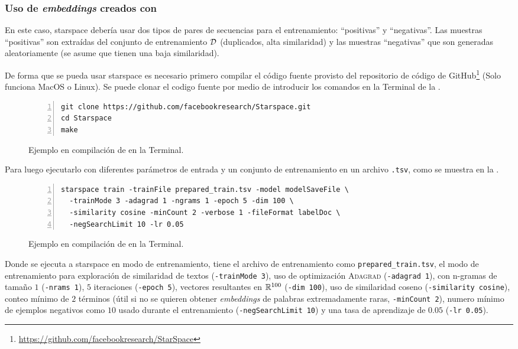\subsubsection{Uso de \emph{embeddings} creados con }
En este caso, \gls{starspace} debería usar dos tipos de pares de secuencias para el entrenamiento: ``positivas'' y ``negativas''. Las muestras ``positivas'' son extraídas del conjunto de entrenamiento $\mathcal{D}$ (duplicados, alta similaridad) y las muestras ``negativas'' que son generadas aleatoriamente (se asume que tienen una baja similaridad).

De forma que se pueda usar \gls{starspace} es necesario primero compilar el código fuente provisto del repositorio de código de GitHub\footnote{\href{https://github.com/facebookresearch/StarSpace}{https://github.com/facebookresearch/StarSpace}} (Solo funciona MacOS o Linux). Se puede clonar el codigo fuente por medio de introducir los  comandos en la Terminal de la .

\begin{figure}[ht]
\centering
\begin{Verbatim}[numbers=left,numbersep=2pt]
git clone https://github.com/facebookresearch/Starspace.git
cd Starspace
make
\end{Verbatim}
\caption{Ejemplo en compilación de  en la Terminal.} 
\label{fig:starspace-terminal-compilation}
\end{figure}

Para luego ejecutarlo con diferentes parámetros de entrada y un conjunto de entrenamiento en un archivo \texttt{.tsv}, como se muestra en la .

\begin{figure}[ht]
\centering
\begin{Verbatim}[fontsize=\footnotesize,numbers=left,numbersep=2pt]
starspace train -trainFile prepared_train.tsv -model modelSaveFile \
  -trainMode 3 -adagrad 1 -ngrams 1 -epoch 5 -dim 100 \
  -similarity cosine -minCount 2 -verbose 1 -fileFormat labelDoc \
  -negSearchLimit 10 -lr 0.05
\end{Verbatim}
\caption{Ejemplo en compilación de \glsentrylong{starspace} en la Terminal.} 
\label{fig:starspace-terminal-execution}
\end{figure}

Donde se ejecuta a \gls{starspace} en modo de entrenamiento, tiene el archivo de entrenamiento como \texttt{prepared\_train.tsv}, el modo de entrenamiento para exploración de similaridad de textos (\texttt{-trainMode 3}), uso de optimización \textsc{Adagrad} (\texttt{-adagrad 1}), con n-gramas de tamaño $1$ (\texttt{-nrams 1}), $5$ iteraciones (\texttt{-epoch 5}), vectores resultantes en $\mathbb{R}^{100}$ (\texttt{-dim 100}), uso de similaridad coseno (\texttt{-similarity cosine}), conteo mínimo de $2$ términos (útil si no se quieren obtener \emph{embeddings} de palabras extremadamente raras, \texttt{-minCount 2}), numero mínimo de ejemplos negativos como $10$ usado durante el entrenamiento (\texttt{-negSearchLimit 10}) y una tasa de aprendizaje de $0.05$ (\texttt{-lr 0.05}).

